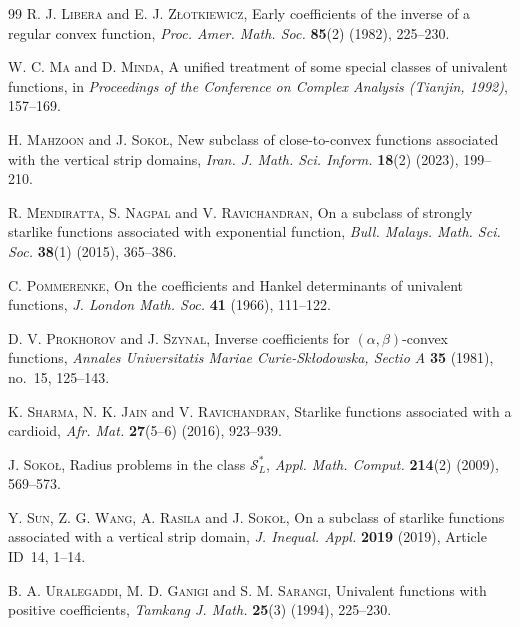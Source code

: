 \documentclass[a4paper,12pt,reqno]{amsart} %
\numberwithin{equation}{section}
\theoremstyle{definition}
\begin{document}
\begin{thebibliography}{99}
\textsc{R. J. Libera} and \textsc{E. J. Z{\l}otkiewicz},
Early coefficients of the inverse of a regular convex function,
\textit{Proc. Amer. Math. Soc.} \textbf{85}(2) (1982), 225--230.

\textsc{W. C. Ma} and \textsc{D. Minda},
A unified treatment of some special classes of univalent functions,
in \textit{Proceedings of the Conference on Complex Analysis (Tianjin, 1992)}, 157--169.

\textsc{H. Mahzoon} and \textsc{J. Soko{\l}},
New subclass of close-to-convex functions associated with the vertical strip domains,
\textit{Iran. J. Math. Sci. Inform.} \textbf{18}(2) (2023), 199--210.

\textsc{R. Mendiratta}, \textsc{S. Nagpal} and \textsc{V. Ravichandran},
On a subclass of strongly starlike functions associated with exponential function,
\textit{Bull. Malays. Math. Sci. Soc.} \textbf{38}(1) (2015), 365--386.

\textsc{C. Pommerenke},
On the coefficients and Hankel determinants of univalent functions,
\textit{J. London Math. Soc.} \textbf{41} (1966), 111--122.

\textsc{D. V. Prokhorov} and \textsc{J. Szynal},
Inverse coefficients for $(\alpha,\beta)$-convex functions,
\textit{Annales Universitatis Mariae Curie-Sk{\l}odowska, Sectio A}
\textbf{35} (1981), no.~15, 125--143.



\textsc{K. Sharma}, \textsc{N. K. Jain} and \textsc{V. Ravichandran},
Starlike functions associated with a cardioid,
\textit{Afr. Mat.} \textbf{27}(5--6) (2016), 923--939.

\textsc{J. Soko{\l}},
Radius problems in the class \( \mathcal{S}_L^* \),
\textit{Appl. Math. Comput.} \textbf{214}(2) (2009), 569--573.


\textsc{Y. Sun}, \textsc{Z. G. Wang}, \textsc{A. Rasila} and \textsc{J. Soko{\l}},
On a subclass of starlike functions associated with a vertical strip domain,
\textit{J. Inequal. Appl.} \textbf{2019} (2019), Article ID~14, 1--14.

\textsc{B. A. Uralegaddi}, \textsc{M. D. Ganigi} and \textsc{S. M. Sarangi},
Univalent functions with positive coefficients,
\textit{Tamkang J. Math.} \textbf{25}(3) (1994), 225--230.

\end{thebibliography}
\end{document}
